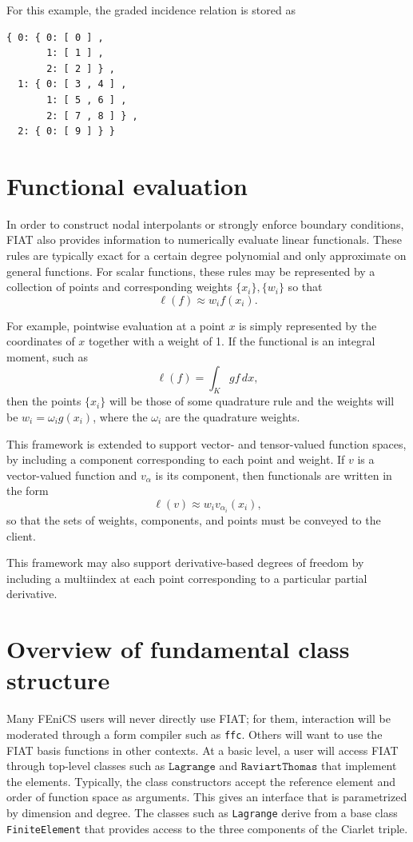 For this example, the graded incidence relation is stored as
\begin{verbatim}
{ 0: { 0: [ 0 ] , 
       1: [ 1 ] ,
       2: [ 2 ] } ,
  1: { 0: [ 3 , 4 ] ,
       1: [ 5 , 6 ] ,
       2: [ 7 , 8 ] } ,
  2: { 0: [ 9 ] } }
\end{verbatim}

\section{Functional evaluation}
In order to construct nodal interpolants or strongly enforce boundary
conditions, FIAT also provides information to numerically evaluate
linear functionals.  These rules are typically exact for a certain
degree polynomial and only approximate on general functions.  For
scalar functions, these rules may be represented by a collection of
points and corresponding weights \( \{ x_i \} , \{ w_i \} \) so that
\[
\ell( f ) \approx w_i f(x_i).
\]

For example, pointwise evaluation at a point \( x \) is simply
represented by the coordinates of \( x \) together with a weight of
1. If the functional is an integral moment, such as
\[
\ell( f ) = \int_K g f \, dx,
\]
then the points \( \{ x_i \} \) will be those of some quadrature rule
and the weights will be \( w_i = \omega_i g(x_i) \), where the \(
\omega_i \) are the quadrature weights.

This framework is extended to support vector- and tensor-valued
function spaces, by including a component corresponding to each point
and weight.  If \( v \) is a vector-valued function and \( v_\alpha \)
is its component, then functionals are written in the form
\[
\ell( v ) \approx w_i v_{\alpha_i}(x_i),
\]
so that the sets of weights, components, and points must be conveyed
to the client.

This framework may also support derivative-based degrees of freedom by
including a multiindex at each point corresponding to a particular
partial derivative.



\section{Overview of fundamental class structure}
Many FEniCS users will never directly use FIAT; for them, interaction will be
moderated through a form compiler such as \texttt{ffc}.  Others will
want to use the FIAT basis functions in other contexts.
At a basic level, a user will access FIAT through top-level classes such as \(
\texttt{Lagrange} \) and \( \texttt{RaviartThomas} \) that implement
the elements.  Typically, the class
constructors accept the reference element and order of function space as
arguments.  This gives an interface that is parametrized by dimension
and degree.  The classes such as \texttt{Lagrange} derive from a base class
\texttt{FiniteElement} that provides access to the three components of
the Ciarlet triple.  

